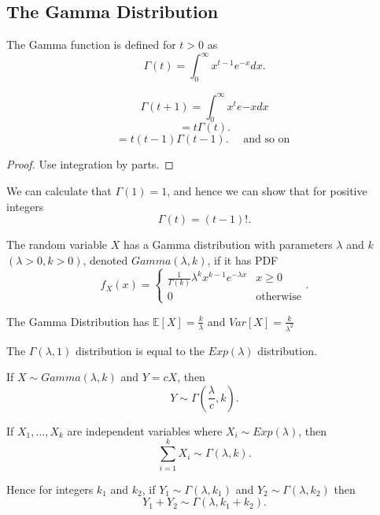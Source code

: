 \subsection{The Gamma Distribution}

\begin{definition}
    The Gamma function is defined for $t > 0$ as
    \[\Gamma(t) = \int_0^{\infty} x^{t - 1} e^{-x} dx.\]


\end{definition}
\begin{lemma}
    \[\Gamma(t + 1) = \int_0^{\infty} x^t e{-x} dx \]
    \[ = t \Gamma(t).\]
    \[= t (t - 1) \Gamma(t - 1). \quad \text{ and so on }\]
\end{lemma}
\begin{proof}
    Use integration by parts.
\end{proof}

\noindent We can calculate that $\Gamma(1) = 1$, and hence we can show that for positive integers
\[\Gamma(t) = (t - 1) !.\]

\begin{definition}
    The random variable $X$ has a Gamma distribution with parameters $\lambda$ and $k$ $(\lambda > 0, k > 0)$, denoted $Gamma(\lambda, k)$, if it has PDF
    \[f_X(x) = \left\{
        \begin{array}{lr}
          \frac{1}{\Gamma(k)} \lambda^kx^{k - 1} e^{-\lambda x} & x \geq 0\\
          0 & \text{otherwise}
        \end{array}
    \right. .\]

    The Gamma Distribution has $\mathbb{E}[X] = \frac{k}{\lambda}$ and $Var[X] = \frac{k}{\lambda^2}$

    The $\Gamma(\lambda, 1)$ distribution is equal to the $Exp(\lambda)$ distribution.

\end{definition}

\begin{prop}
    If $X \sim Gamma(\lambda, k)$ and $Y = cX$, then
    \[Y \sim \Gamma(\frac{\lambda}{c}, k).\]
\end{prop}

\begin{prop}
    If $X_1,...,X_k$ are independent variables where $X_i \sim Exp(\lambda)$, then
    \[\sum_{i=1}^k X_i \sim \Gamma(\lambda, k).\]

    Hence for integers $k_1$ and $k_2$, if $Y_1 \sim \Gamma(\lambda, k_1)$ and $Y_2 \sim \Gamma(\lambda, k_2)$ then
    \[Y_1 + Y_2 \sim \Gamma(\lambda, k_1 + k_2).\]
\end{prop}

